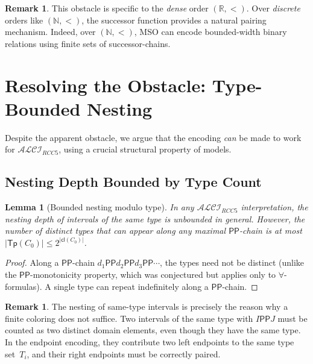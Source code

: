 \documentclass[a4paper,11pt]{article}
\newtheorem{lemma}[theorem]{Lemma}
\theoremstyle{definition}
\newtheorem{remark}[theorem]{Remark}
\newcommand{\ALCIRCC}[1]{\ensuremath{\mathcal{ALCI}_{\mathit{RCC#1}}}}
\newcommand{\PP}{\ensuremath{\mathsf{PP}}}
\newcommand{\cl}{\ensuremath{\mathsf{cl}}}
\newcommand{\Tp}{\ensuremath{\mathsf{Tp}}}
\newcommand{\reals}{\ensuremath{\mathbb{R}}}
\newcommand{\nats}{\ensuremath{\mathbb{N}}}
\begin{document}
\begin{remark}
This obstacle is specific to the \emph{dense} order $(\reals, <)$.
Over \emph{discrete} orders like $(\nats, <)$, the successor function
provides a natural pairing mechanism.  Indeed, over $(\nats, <)$,
MSO can encode bounded-width binary relations using finite sets of
successor-chains.
\end{remark}

\section{Resolving the Obstacle: Type-Bounded Nesting}
\label{sec:resolution}

Despite the apparent obstacle, we argue that the encoding \emph{can}
be made to work for $\ALCIRCC{5}$, using a crucial structural
property of models.

\subsection{Nesting Depth Bounded by Type Count}
\label{sec:nesting-bound}

\begin{lemma}[Bounded nesting modulo type]
\label{lem:bounded-nesting}
In any $\ALCIRCC{5}$ interpretation, the nesting depth of intervals
\emph{of the same type} is unbounded in general.  However, the number of
distinct types that can appear along any maximal $\PP$-chain is at most
$|\Tp(C_0)| \leq 2^{|\cl(C_0)|}$.
\end{lemma}

\begin{proof}
Along a $\PP$-chain $d_1 \PP d_2 \PP d_3 \PP \cdots$, the types
need not be distinct (unlike the $\PP$-monotonicity property, which
was conjectured but applies only to $\forall$-formulas).  A single
type can repeat indefinitely along a $\PP$-chain.
\end{proof}

\begin{remark}
The nesting of same-type intervals is precisely the reason why a
finite coloring does not suffice.  Two intervals of the same type
with $I \PP J$ must be counted as two distinct domain elements, even
though they have the same type.  In the endpoint encoding, they
contribute two left endpoints to the same type set~$T_i$, and
their right endpoints must be correctly paired.
\end{remark}
\end{document}
